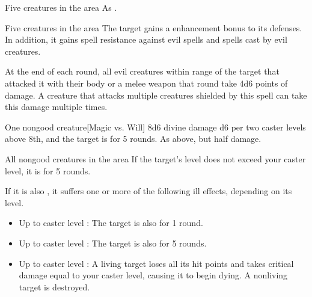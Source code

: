 \begin{spelltargets}{Five creatures in the area}
    \spellsuccess As .
\end{spelltargets}

\spelldur{\durshort \dismissable}
\begin{spelltargets}{Five creatures in the area}
    The target gains a  enhancement bonus to its defenses. In addition, it gains spell resistance against evil spells and spells cast by evil creatures.
    \par At the end of each round, all evil creatures within \rngclose range of the target that attacked it with their body or a melee weapon that round take 4d6 points of damage. A creature that attacks multiple creatures shielded by this spell can take this damage multiple times.
\end{spelltargets}

\spellrng{\rngmed}
\begin{spelltarget}{One nongood creature}[Magic vs. Will]
    \spellsuccess 8d6 divine damage \add d6 per two caster levels above 8th, and the target is \bewildered for 5 rounds.
    \spellfailure As above, but half damage.
\end{spelltarget}

\begin{spelltargets}{All nongood creatures in the area}
    \spelleffect If the target's level does not exceed your caster level, it is \deafened for 5 rounds.

    If it is also \bloodied, it suffers one or more of the following ill effects, depending on its level.
    \begin{itemize}
        \item Up to caster level : The target is also \blinded for 1 round.
        \item Up to caster level : The target is also \paralyzed for 5 rounds.
        \item Up to caster level : A living target loses all its hit points and takes critical damage equal to your caster level, causing it to begin dying. A nonliving target is destroyed.
    \end{itemize}
\end{spelltargets}

